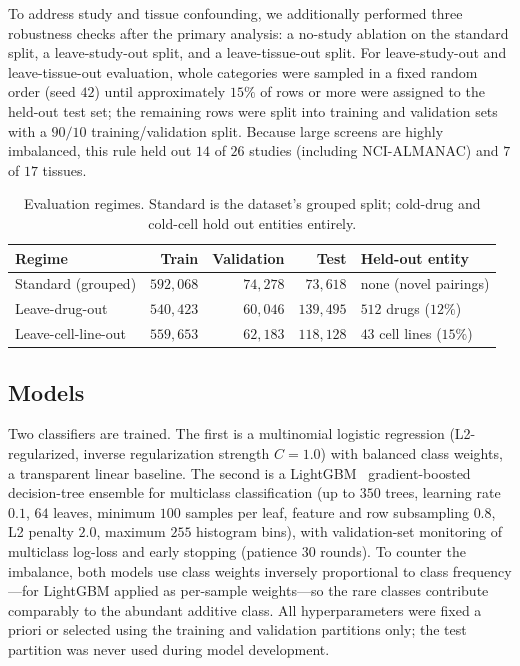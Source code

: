 \documentclass[11pt]{article}
\begin{document}
To address study and tissue confounding, we additionally performed three robustness checks after the
primary analysis: a no-study ablation on the standard split, a leave-study-out split, and a
leave-tissue-out split. For leave-study-out and leave-tissue-out evaluation, whole categories were
sampled in a fixed random order (seed $42$) until approximately $15\%$ of rows or more were assigned to
the held-out test set; the remaining rows were split into training and validation sets with a $90/10$
training/validation split. Because large screens are highly imbalanced, this rule held out $14$ of
$26$ studies (including NCI-ALMANAC) and $7$ of $17$ tissues.

\begin{table}[H]
\centering
\caption{Evaluation regimes. Standard is the dataset's grouped split; cold-drug and cold-cell hold out
entities entirely.}
\label{tab:splits}
\small
\begin{tabular}{lrrrl}
\toprule
Regime & Train & Validation & Test & Held-out entity \\
\midrule
Standard (grouped) & $592{,}068$ & $74{,}278$ & $73{,}618$ & none (novel pairings) \\
Leave-drug-out & $540{,}423$ & $60{,}046$ & $139{,}495$ & $512$ drugs ($12\%$) \\
Leave-cell-line-out & $559{,}653$ & $62{,}183$ & $118{,}128$ & $43$ cell lines ($15\%$) \\
\bottomrule
\end{tabular}
\end{table}

\subsection{Models}
Two classifiers are trained. The first is a multinomial logistic regression (L2-regularized, inverse
regularization strength $C=1.0$) with balanced class weights, a transparent linear baseline. The second
is a LightGBM~\cite{ke2017} gradient-boosted decision-tree ensemble for multiclass classification (up
to $350$ trees, learning rate $0.1$, $64$ leaves, minimum $100$ samples per leaf, feature and row
subsampling $0.8$, L2 penalty $2.0$, maximum $255$ histogram bins), with validation-set monitoring of
multiclass log-loss and early stopping (patience $30$ rounds). To counter the imbalance, both models
use class weights inversely proportional to class frequency---for LightGBM applied as per-sample
weights---so the rare classes contribute comparably to the abundant additive class. All hyperparameters
were fixed a priori or selected using the training and validation partitions only; the test partition
was never used during model development.
\end{document}
